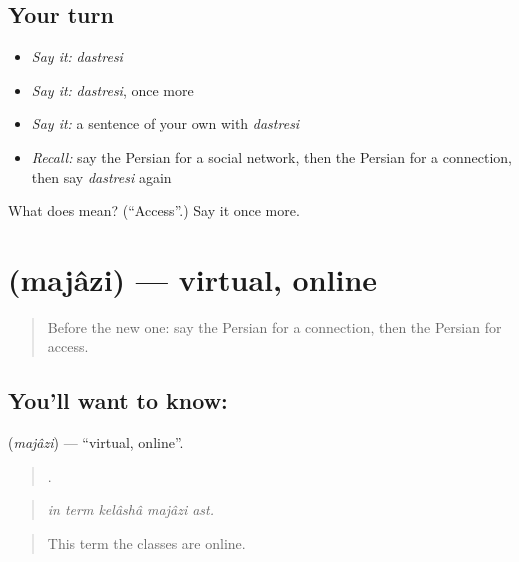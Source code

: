 \subsection*{Your turn}
\begin{itemize}
\raggedright
  \item \emph{Say it:} \emph{dastresi}
  \item \emph{Say it:} \emph{dastresi}, once more
  \item \emph{Say it:} a sentence of your own with \emph{dastresi}
  \item \emph{Recall:} say the Persian for a social network, then the Persian for a connection, then say \emph{dastresi} again
\end{itemize}

\begin{tcolorbox}[breakable,colback=teal!4,colframe=teal!35!black,title={Before you move on}]
What does  mean? (\textquotedblleft{}Access\textquotedblright{}.) Say it once more.
\end{tcolorbox}
\section[\texorpdfstring{\fa{مجازی} (majâzi)}{مجازی (majâzi)}]{ (majâzi) — virtual, online}

\label{lesson:FA-C417-majazi}



\begin{quote}
Before the new one: say the Persian for a connection, then the Persian for access.
\end{quote}

\subsection*{You'll want to know: }
\textbf{} (\emph{majâzi}) — \textquotedblleft{}virtual, online\textquotedblright{}.

\begin{quote}
    .
\end{quote}

\begin{quote}
\emph{in term kelâshâ majâzi ast.}
\end{quote}

\begin{quote}
This term the classes are online.
\end{quote}

